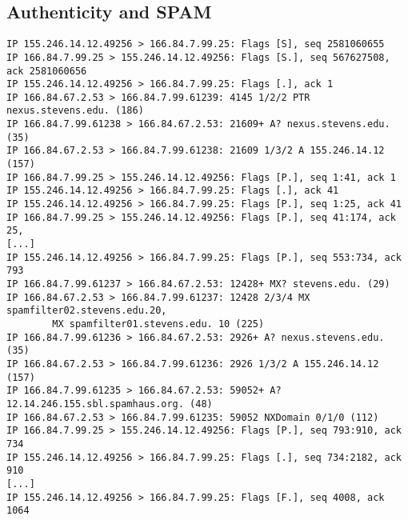 \documentclass[xga]{xdvislides}
\begin{document}
\subsection{Authenticity and SPAM}
\smallish
\begin{verbatim}
IP 155.246.14.12.49256 > 166.84.7.99.25: Flags [S], seq 2581060655
IP 166.84.7.99.25 > 155.246.14.12.49256: Flags [S.], seq 567627508, ack 2581060656
IP 155.246.14.12.49256 > 166.84.7.99.25: Flags [.], ack 1
IP 166.84.67.2.53 > 166.84.7.99.61239: 4145 1/2/2 PTR nexus.stevens.edu. (186)
IP 166.84.7.99.61238 > 166.84.67.2.53: 21609+ A? nexus.stevens.edu. (35)
IP 166.84.67.2.53 > 166.84.7.99.61238: 21609 1/3/2 A 155.246.14.12 (157)
IP 166.84.7.99.25 > 155.246.14.12.49256: Flags [P.], seq 1:41, ack 1
IP 155.246.14.12.49256 > 166.84.7.99.25: Flags [.], ack 41
IP 155.246.14.12.49256 > 166.84.7.99.25: Flags [P.], seq 1:25, ack 41
IP 166.84.7.99.25 > 155.246.14.12.49256: Flags [P.], seq 41:174, ack 25,
[...]
IP 155.246.14.12.49256 > 166.84.7.99.25: Flags [P.], seq 553:734, ack 793
IP 166.84.7.99.61237 > 166.84.67.2.53: 12428+ MX? stevens.edu. (29)
IP 166.84.67.2.53 > 166.84.7.99.61237: 12428 2/3/4 MX spamfilter02.stevens.edu.20,
        MX spamfilter01.stevens.edu. 10 (225)
IP 166.84.7.99.61236 > 166.84.67.2.53: 2926+ A? nexus.stevens.edu. (35)
IP 166.84.67.2.53 > 166.84.7.99.61236: 2926 1/3/2 A 155.246.14.12 (157)
IP 166.84.7.99.61235 > 166.84.67.2.53: 59052+ A? 12.14.246.155.sbl.spamhaus.org. (48)
IP 166.84.67.2.53 > 166.84.7.99.61235: 59052 NXDomain 0/1/0 (112)
IP 166.84.7.99.25 > 155.246.14.12.49256: Flags [P.], seq 793:910, ack 734
IP 155.246.14.12.49256 > 166.84.7.99.25: Flags [.], seq 734:2182, ack 910
[...]
IP 155.246.14.12.49256 > 166.84.7.99.25: Flags [F.], seq 4008, ack 1064
\end{verbatim}
\Normalsize
\end{document}
